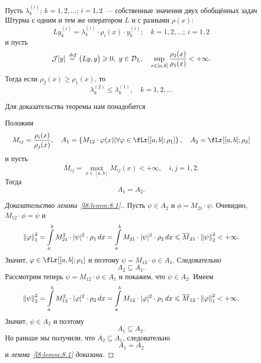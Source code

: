 \begin{Teor}\label{l8:teor:8.1}
	Пусть $\lambda_k^{(i)}$; $k=1,2,\ldots$; $i\?=1,2$ --- собственные значения двух обобщённых задач Штурма с одним и тем же оператором $L$  и с разными $\rho(x)$:
	\begin{equation*}
		Ly_k^{(i)}=\lambda_{k}^{(i)}\cdot\rho_i(x)\cdot y_k^{(i)};\quad k=1,2,\ldots;\ i=1,2
	\end{equation*}
	и пусть 
	\begin{equation*}
		\J[y]\eqdef\big(L y,y\big)\geqslant0,\ y\in\mc{D}_{L},\quad\sup\limits_{x\in[a,b]}\frac{\rho_2(x)}{\rho_1(x)}<+\infty.
	\end{equation*}
	Тогда если $\rho_2(x)\geqslant\rho_1(x)$, то
	\begin{equation}\label{l8:eq:1.5}
		\lambda_k^{(2)}\leqslant\lambda_k^{(1)},\quad k=1,2,\ldots
	\end{equation}
\end{Teor}
\noindent Для доказательства теоремы нам понадобится 
\begin{Lemm}\label{l8:lemm:8.1}
	Положим 
	\begin{equation*}
		M_{ij}=\frac{\rho_i(x)}{\rho_j(x)},\quad A_1=\left\{M_{12}\cdot\phi(x)\middle|\forall\phi\in\fLr[{[a,b];\rho_1}]\right\},\quad A_2=\fLr[{[a,b];\rho_2}]
	\end{equation*}
	и пусть 
	\begin{equation*}
		\overline{M}_{ij}=\max\limits_{x\in[a,b]}M_{ij}(x)<+\infty,\quad i,j=1,2.
	\end{equation*}
	Тогда
	\begin{equation*}
		A_1=A_2.
	\end{equation*}
\end{Lemm}
\begin{proof}[Доказательство леммы~\ref{l8:lemm:8.1}.]
	Пусть $\psi\in A_2$ и $\phi=M_{21}\cdot\psi$. Очевидно, $M_{12}\cdot\phi=\psi$ и 
	\begin{equation*}
		\left\|\varphi\right\|_1^2=\int\limits_{a}^{b}M_{21}^2\cdot|\psi|^2\cdot\rho_1\,dx=\int\limits_{a}^{b}M_{21}\cdot|\psi|^2\cdot\rho_2\,dx\leqslant\overline{M}_{21}\cdot\left\|\psi\right\|_2^2<+\infty.
	\end{equation*}
	Значит, $\phi\in\fLr[{[a,b];\rho_1}]$ и поэтому $\psi=M_{12}\cdot\phi\in A_1$. Следовательно
	\begin{equation*}
		A_2\subseteq A_1.
	\end{equation*}
	Рассмотрим теперь $\psi=M_{12}\cdot\phi\in A_1$ и покажем, что $\psi\in A_2$. Имеем
	\begin{equation*}
		\left\|\psi\right\|_2^2=\int\limits_a^b M_{12}^2\cdot|\varphi|^2\cdot\rho_2\,dx=\int\limits_a^b M_{12}\cdot|\varphi|^2\cdot\rho_1\,dx\leqslant\overline{M}_{12}\cdot\left\|\varphi\right\|_1^2<+\infty.
	\end{equation*}
	Значит, $\psi\in A_2$ и поэтому 
	\begin{equation*}
		A_1\subseteq A_2.
	\end{equation*}
	Но раньше мы получили, что $A_2\subseteq A_1$, следовательно
	\begin{equation*}
		A_1=A_2
	\end{equation*}
	и \emph{лемма~\ref{l8:lemm:8.1} доказана.}
\end{proof}
